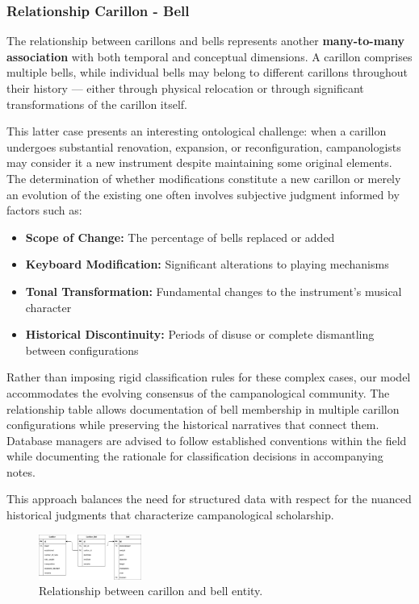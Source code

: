 \documentclass[11pt, a4paper]{article}
\begin{document}
\subsubsection{Relationship Carillon - Bell}

The relationship between carillons and bells represents another \textbf{many-to-many association} with both temporal and conceptual dimensions. A carillon comprises multiple bells, while individual bells may belong to different carillons throughout their history — either through physical relocation or through significant transformations of the carillon itself. 

This latter case presents an interesting ontological challenge: when a carillon undergoes substantial renovation, expansion, or reconfiguration, campanologists may consider it a new instrument despite maintaining some original elements. The determination of whether modifications constitute a new carillon or merely an evolution of the existing one often involves subjective judgment informed by factors such as:

\begin{itemize}
    \item \textbf{Scope of Change:} The percentage of bells replaced or added
    \item \textbf{Keyboard Modification:} Significant alterations to playing mechanisms
    \item \textbf{Tonal Transformation:} Fundamental changes to the instrument's musical character
    \item \textbf{Historical Discontinuity:} Periods of disuse or complete dismantling between configurations
\end{itemize}

Rather than imposing rigid classification rules for these complex cases, our model accommodates the evolving consensus of the campanological community. The relationship table allows documentation of bell membership in multiple carillon configurations while preserving the historical narratives that connect them. Database managers are advised to follow established conventions within the field while documenting the rationale for classification decisions in accompanying notes.

This approach balances the need for structured data with respect for the nuanced historical judgments that characterize campanological scholarship.

\begin{figure}[h!]
    \centering
    \includegraphics[width=0.3\textwidth]{images/carillon_bell.png}
    \caption{Relationship between carillon and bell entity.}
    \label{fig:carillon_bell-relation}
\end{figure}
\end{document}

